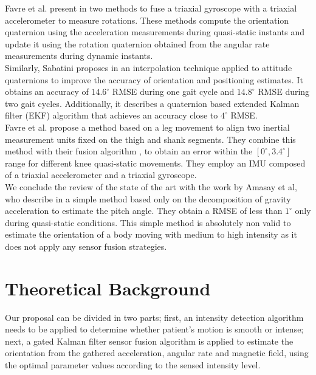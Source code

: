\documentclass{IOS-Book-Article}
\begin{document}
\indent Favre et al. present in \cite{favre_quaternion-based_2006} two methods to fuse a triaxial gyroscope with a triaxial accelerometer to measure rotations. These methods compute the orientation quaternion using the acceleration measurements during quasi-static instants and update it using the rotation quaternion obtained from the angular rate measurements during dynamic instants. \\
\indent Similarly, Sabatini proposes in \cite{sabatini_quaternion-based_2005} an interpolation technique applied to attitude quaternions to improve the accuracy of orientation and positioning estimates. It obtains an accuracy of $14.6^{\circ}$ RMSE during one gait cycle and $14.8^{\circ}$ RMSE during two gait cycles. Additionally, it describes a quaternion based extended Kalman filter (EKF) algorithm that achieves an accuracy close to $4^{\circ}$ RMSE.\\
\indent Favre et al. propose a method based on a leg movement to align two inertial measurement units fixed on the thigh and shank segments. They combine this method with their fusion algorithm \cite{favre_quaternion-based_2006}, to obtain an error within the $[0^{\circ},3.4^{\circ}]$ range for different knee quasi-static movements. They employ an IMU composed of a triaxial accelerometer and a triaxial gyroscope.\\ 
\indent We conclude the review of the state of the art with the work by Amasay et al, who describe in \cite{amasay_validation_2009} a simple method based only on the decomposition of gravity acceleration to estimate the pitch angle. They obtain a RMSE of less than $1^{\circ}$ only during quasi-static conditions. This simple method is absolutely non valid to estimate the orientation of a body moving with medium to high intensity as it does not apply any sensor fusion strategies.

\section{Theoretical Background}
\label{sec:theory}
\indent \indent Our proposal can be divided in two parts; first, an intensity detection algorithm needs to be applied to determine whether patient's motion is smooth or intense; next, a gated Kalman filter sensor fusion algorithm is applied to estimate the orientation from the ga\-the\-red acceleration, angular rate and magnetic field, using the optimal parameter values according to the sensed intensity level. 
\end{document}
